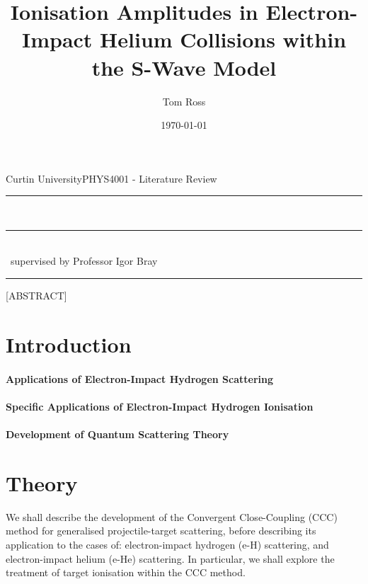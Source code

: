\documentclass[draft]{article}
\title{Ionisation Amplitudes in Electron-Impact Helium Collisions within the
  S-Wave Model}
\author{Tom Ross}
\date{\today}
\gdef\theassessment{PHYS4001 - Literature Review}
\gdef\thesupervisor{Professor Igor Bray}
\gdef\theinstitution{Curtin University}
\begin{document}

\begin{titlepage}
  \begin{flushleft}
    \theinstitution \hfill \theassessment
  \end{flushleft}
  \hrule
  \begin{center}
    {
      \huge
      \thetitle
    }
    ~\\
    \rule[1.0pt]{8.5cm}{0.4pt}
    ~\\
    {
      \large
      \theauthor ~supervised by \thesupervisor
    }
  \end{center}
  \hrule
  \begin{center}
    [ABSTRACT]
  \end{center}
\end{titlepage}

\clearpage


\tableofcontents

\listoffigures

\listoftables


\clearpage

\section{Introduction}
\label{sec:introduction}

\paragraph{Applications of Electron-Impact Hydrogen Scattering}

\paragraph{Specific Applications of Electron-Impact Hydrogen Ionisation}

\paragraph{Development of Quantum Scattering Theory}

\section{Theory}
\label{sec:theory}

We shall describe the development of the Convergent Close-Coupling (CCC) method
for generalised projectile-target scattering, before describing its application
to the cases of: electron-impact hydrogen (e-H) scattering, and electron-impact
helium (e-He) scattering.
In particular, we shall explore the treatment of target ionisation within the CCC
method.
\end{document}
